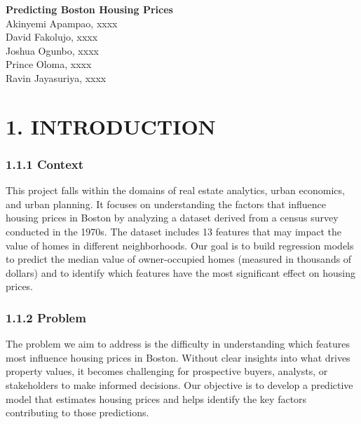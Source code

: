 \documentclass[
]{article}
\author{}
\date{\vspace{-2.5em}}
\begin{document}
\thispagestyle{empty}

\vspace*{5cm}

\begin{center}
    {\LARGE \textbf{Predicting Boston Housing Prices}}\\[1em]
    {\large Akinyemi Apampao, xxxx}\\[1em]
    {\large David Fakolujo, xxxx}\\[1em]
    {\large Joshua Ogunbo, xxxx}\\[1em]
    {\large Prince Oloma, xxxx}\\[1em]
    {\large Ravin Jayasuriya, xxxx}\\
\end{center}

\newpage

\section{1. INTRODUCTION}\label{introduction}

\subsubsection{1.1.1 Context}\label{context}

This project falls within the domains of real estate analytics, urban
economics, and urban planning. It focuses on understanding the factors
that influence housing prices in Boston by analyzing a dataset derived
from a census survey conducted in the 1970s. The dataset includes 13
features that may impact the value of homes in different neighborhoods.
Our goal is to build regression models to predict the median value of
owner-occupied homes (measured in thousands of dollars) and to identify
which features have the most significant effect on housing prices.

\subsubsection{1.1.2 Problem}\label{problem}

The problem we aim to address is the difficulty in understanding which
features most influence housing prices in Boston. Without clear insights
into what drives property values, it becomes challenging for prospective
buyers, analysts, or stakeholders to make informed decisions. Our
objective is to develop a predictive model that estimates housing prices
and helps identify the key factors contributing to those predictions.
\end{document}
